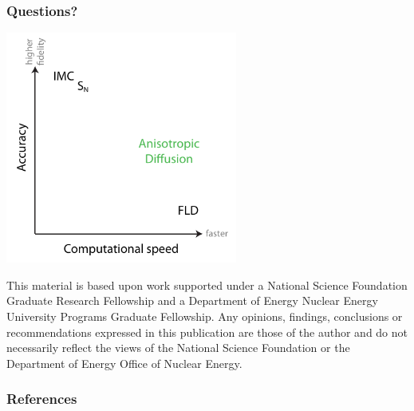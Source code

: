 \documentclass[draft]{beamer}
\begin{document}
\begin{frame}
  \frametitle{Questions?}
\begin{center}
  \includegraphics[width=3in]{../figures/fidelity2}
\end{center}
{\tiny
This material is based upon work supported under a National Science Foundation
Graduate Research Fellowship and a Department of Energy Nuclear Energy
University Programs Graduate Fellowship. Any opinions, findings, conclusions or
recommendations expressed in this publication are those of the author and do
not necessarily reflect the views of the National Science Foundation or the
Department of Energy Office of Nuclear Energy.}
\end{frame}

\begin{frame}
  \frametitle{References}


\end{frame}

\end{document}
